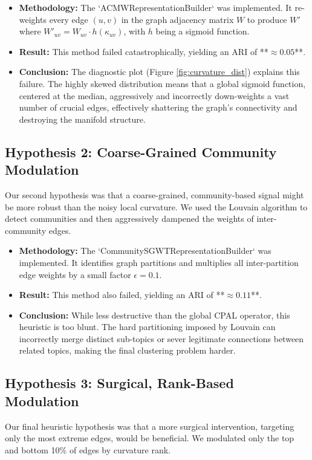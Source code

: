 \documentclass[11pt, a4paper]{article}
\begin{document}
\begin{itemize}
    \item \textbf{Methodology:} The `ACMWRepresentationBuilder` was implemented. It re-weights every edge $(u,v)$ in the graph adjacency matrix $W$ to produce $W'$ where $W'_{uv} = W_{uv} \cdot h(\kappa_{uv})$, with $h$ being a sigmoid function.
    \item \textbf{Result:} This method failed catastrophically, yielding an ARI of **$\approx 0.05$**.
    \item \textbf{Conclusion:} The diagnostic plot (Figure \ref{fig:curvature_dist}) explains this failure. The highly skewed distribution means that a global sigmoid function, centered at the median, aggressively and incorrectly down-weights a vast number of crucial edges, effectively shattering the graph's connectivity and destroying the manifold structure.
\end{itemize}

\subsection{Hypothesis 2: Coarse-Grained Community Modulation}
Our second hypothesis was that a coarse-grained, community-based signal might be more robust than the noisy local curvature. We used the Louvain algorithm to detect communities and then aggressively dampened the weights of inter-community edges.

\begin{itemize}
    \item \textbf{Methodology:} The `CommunitySGWTRepresentationBuilder` was implemented. It identifies graph partitions and multiplies all inter-partition edge weights by a small factor $\epsilon=0.1$.
    \item \textbf{Result:} This method also failed, yielding an ARI of **$\approx 0.11$**.
    \item \textbf{Conclusion:} While less destructive than the global CPAL operator, this heuristic is too blunt. The hard partitioning imposed by Louvain can incorrectly merge distinct sub-topics or sever legitimate connections between related topics, making the final clustering problem harder.
\end{itemize}

\subsection{Hypothesis 3: Surgical, Rank-Based Modulation}
Our final heuristic hypothesis was that a more surgical intervention, targeting only the most extreme edges, would be beneficial. We modulated only the top and bottom 10\% of edges by curvature rank.
\end{document}
